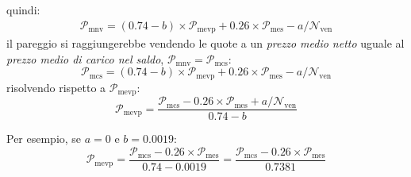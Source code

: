 \documentclass[12pt,a4paper]{article}
\newcommand{\Nven}[1]{\mathcal{N}_{\textrm{ven}#1}}
\newcommand{\Pme}[1]{\mathcal{P}_{\mathrm{me}#1}}
\newcommand{\Pmes}[1]{\Pme{\mathrm{s}#1}}
\newcommand{\Pmc}[1]{\mathcal{P}_{\mathrm{mc}#1}}
\newcommand{\Pmcs}[1]{\Pmc{\mathrm{s}#1}}
\newcommand{\Pmnv}[1]{\mathcal{P}_{\mathrm{mnv}#1}}
\newcommand{\Pmevp}[1]{\mathcal{P}_{\mathrm{mevp}#1}}
\begin{document}
quindi:
\begin{align*}
  \Pmnv{}
  = \left( \num{0,74} - b \right) \times{} \Pmevp{}
  + \num{0,26} \times{} \Pmes{}
  - a / \Nven{}
\end{align*}
il  pareggio  si  raggiungerebbe  vendendo  le  quote a  un  \emph{prezzo  medio  netto}  uguale  al
\emph{prezzo medio di carico nel saldo}, \(\Pmnv{} = \Pmcs{}\):
\begin{equation*}
  \Pmcs{}
  = \left( \num{0,74} - b \right) \times{} \Pmevp{}
  + \num{0,26} \times{} \Pmes{}
  - a / \Nven{}
\end{equation*}
risolvendo rispetto a \(\Pmevp{}\):
\begin{equation*}
  \Pmevp{}
  = \frac{\Pmcs{} - \num{0,26} \times{} \Pmes{} + a / \Nven{}}
  {\num{0,74} - b}
\end{equation*}

Per esempio, se \(a = 0\) e \(b = \num{0,0019}\):
\begin{equation*}
  \Pmevp{}
  = \frac{\Pmcs{} - \num{0,26} \times{} \Pmes{}}{\num{0,74} - \num{0,0019}}
  = \frac{\Pmcs{} - \num{0,26} \times{} \Pmes{}}{\num{0,7381}}
\end{equation*}






\end{document}
